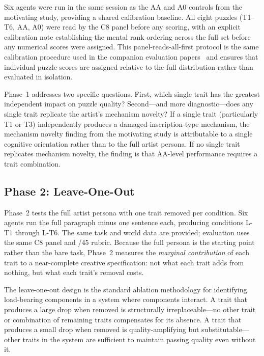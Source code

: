 Six agents were run in the same session as the AA and A0 controls from the motivating study, providing a shared calibration baseline. All eight puzzles (T1--T6, AA, A0) were read by the C8 panel before any scoring, with an explicit calibration note establishing the mental rank ordering across the full set before any numerical scores were assigned. This panel-reads-all-first protocol is the same calibration procedure used in the companion evaluation papers~\cite{dellaLibera2025panel,dellaLibera2025taxonomy} and ensures that individual puzzle scores are assigned relative to the full distribution rather than evaluated in isolation.

Phase~1 addresses two specific questions. First, which single trait has the greatest independent impact on puzzle quality? Second---and more diagnostic---does any single trait replicate the artist's mechanism novelty? If a single trait (particularly T1 or T3) independently produces a damaged-inscription-type mechanism, the mechanism novelty finding from the motivating study is attributable to a single cognitive orientation rather than to the full artist persona. If no single trait replicates mechanism novelty, the finding is that AA-level performance requires a trait combination.

\subsection{Phase 2: Leave-One-Out}

Phase~2 tests the full artist persona with one trait removed per condition. Six agents run the full paragraph minus one sentence each, producing conditions L-T1 through L-T6. The same task and world data are provided; evaluation uses the same C8 panel and /45 rubric. Because the full persona is the starting point rather than the bare task, Phase~2 measures the \emph{marginal contribution} of each trait to a near-complete creative specification: not what each trait adds from nothing, but what each trait's removal costs.

The leave-one-out design is the standard ablation methodology for identifying load-bearing components in a system where components interact. A trait that produces a large drop when removed is structurally irreplaceable---no other trait or combination of remaining traits compensates for its absence. A trait that produces a small drop when removed is quality-amplifying but substitutable---other traits in the system are sufficient to maintain passing quality even without it.

